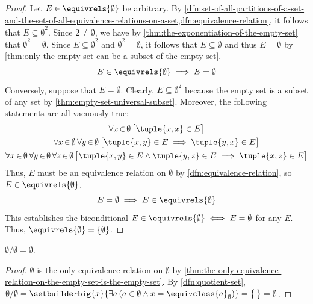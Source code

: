 \begin{proof}
    Let \( E \in \equivrels{\emptyset} \) be arbitrary.
    By \cref{dfn:set-of-all-partitions-of-a-set-and-the-set-of-all-equivalence-relations-on-a-set,dfn:equivalence-relation},
    it follows that \( E \subseteq \emptyset^{2} \).
    Since \( 2 \neq \emptyset \), we have by \cref{thm:the-exponentiation-of-the-empty-set} that \( \emptyset^{2} = \emptyset \).
    Since \( E \subseteq \emptyset^{2} \) and \( \emptyset^{2} = \emptyset \),
    it follows that \( E \subseteq \emptyset \) and thus \( E = \emptyset \) by
    \cref{thm:only-the-empty-set-can-be-a-subset-of-the-empty-set}.
    \begin{equation*}
        E \in \equivrels{\emptyset} \implies E = \emptyset
    \end{equation*}
    Conversely, suppose that \( E = \emptyset \). Clearly, \( E \subseteq \emptyset^{2} \) because the empty set is a subset
    of any set by \cref{thm:empty-set-universal-subset}. Moreover, the following statements are all vacuously true:
    \begin{gather*}
        \forall x\,{\in}\,\emptyset \, \big[ \tuple{x,x} \in E \big]\\
        \forall x\,{\in}\,\emptyset \, \forall y\,{\in}\,\emptyset \, \big[ \tuple{x,y} \in E \implies \tuple{y,x} \in E \big]\\
        \forall x\,{\in}\,\emptyset \, \forall y\,{\in}\,\emptyset \, \forall z\,{\in}\,\emptyset \,
        \big[ \tuple{x,y} \in E \land \tuple{y,z} \in E \implies \tuple{x,z} \in E \big]
    \end{gather*}
    Thus, \( E \) must be an equivalence relation on \( \emptyset \) by \cref{dfn:equivalence-relation}, so \( E \in \equivrels{\emptyset} \).
    \begin{equation*}
        E = \emptyset \implies E \in \equivrels{\emptyset}
    \end{equation*}
    This establishes the biconditional \( E \in \equivrels{\emptyset} \iff E = \emptyset \) for any \( E \).
    Thus, \( \equivrels{\emptyset} = \mleft\{ \emptyset \mright\} \).
\end{proof}

\begin{cor}
    \label{thm:the-quotient-set-of-empty-set-with-respect-to-empty-set-is-the-empty-set}
    \( \emptyset / \emptyset = \emptyset \).
\end{cor}

\begin{proof}
    \( \emptyset \) is the only equivalence relation on \( \emptyset \)
    by \cref{thm:the-only-equivalence-relation-on-the-empty-set-is-the-empty-set}.
    By \cref{dfn:quotient-set},
    \( \emptyset / \emptyset =
    \setbuilderbig{x}{\exists a \, ( a \in \emptyset \land x = \equivclass{a}_{\emptyset} )}
    = \big\{ \, \big\} = \emptyset \).
\end{proof}

